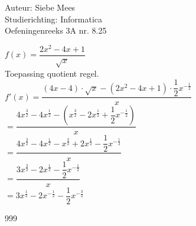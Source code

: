 \documentclass[a4paper]{article}
\begin{document}
  
\noindent \large Auteur: Siebe Mees \\
\noindent \large Studierichting: Informatica\\
\noindent \large Oefeningenreeks 3A nr. 8.25\\

\medskip

\normalsize

$ f(x) = \dfrac{2x^2-4x+1}{\sqrt{x}} $ \\

Toepassing quotient regel. \\

$ f'(x) = \dfrac{(4x-4) \cdot \sqrt{x} - (2x^2-4x+1) \cdot \dfrac{1}{2} x^{- \tfrac{1}{2}}}{x} $ \\

$ = \dfrac{4x^{\tfrac{3}{2}} - 4x^{\tfrac{1}{2}} - (x^{\tfrac{3}{2}} - 2x^{\tfrac{1}{2}} + \dfrac{1}{2} x^{-\tfrac{1}{2}})}{x} $ \\

$ = \dfrac{4x^{\tfrac{3}{2}} - 4x^{\tfrac{1}{2}} - x^{\tfrac{3}{2}} + 2x^{\tfrac{1}{2}} - \dfrac{1}{2} x^{-\tfrac{1}{2}}}{x} $ \\

$ = \dfrac{3x^{\tfrac{3}{2}} - 2x^{\tfrac{1}{2}} - \dfrac{1}{2} x^{-\tfrac{1}{2}} }{x} $ \\

$ = 3x^{\tfrac{1}{2}} - 2x^{-\tfrac{1}{2}} - \dfrac{1}{2} x^{-\tfrac{3}{2}} $ \\


\begin{thebibliography}{999}
\end{thebibliography}
\end{document}
